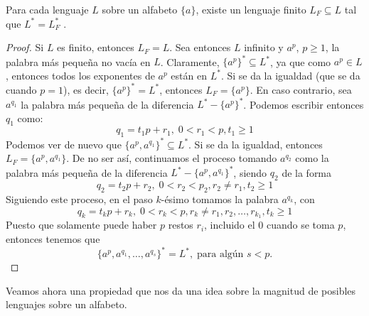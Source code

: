 \begin{teorema} Para cada lenguaje $L$ sobre un alfabeto $\{a\}$, existe un lenguaje finito $L_F\subseteq L$ tal que
$L^*=L_F^*$ \cite{Mateescu1997}.
\end{teorema}
\begin{proof}
Si $L$ es finito, entonces $L_F=L$. Sea entonces $L$ infinito y $a^p$, $p\geq 1$, la palabra más pequeña no vacía en 
$L$. Claramente, $\{a^p\}^*\subseteq L^*$, ya que como $a^p\in L$, entonces todos los exponentes de $a^p$ están en
$L^*$. Si se da la igualdad (que se da cuando $p=1$), es decir, $\{a^p\}^*=L^*$, entonces $L_F=\{a^p\}$. En caso
contrario, sea $a^{q_1}$ la palabra más pequeña de la diferencia $L^*-\{a^p\}^*$. Podemos escribir entonces $q_1$ como:
\begin{equation}
    q_1=t_1p+r_1,\;0<r_1<p,t_1\geq 1
\end{equation}
Podemos ver de nuevo que $\{a^p, a^{q_1}\}^*\subseteq L^*$. Si se da la igualdad, entonces $L_F=\{a^p, a^{q_1}\}$. De
no ser así, continuamos el proceso tomando $a^{q_2}$ como la palabra más pequeña de la diferencia 
$L^*-\{a^p, a^{q_1}\}^*$, siendo $q_2$ de la forma
\begin{equation}
    q_2=t_2p+r_2,\;0<r_2<p_2, r_2\neq r_1, t_2\geq 1
\end{equation}
Siguiendo este proceso, en el paso $k$-ésimo tomamos la palabra $a^{q_k}$, con
\begin{equation}
    q_k=t_kp+r_k,\;0<r_k<p, r_k\neq r_1, r_2, \dots, r_{k_1}, t_k\geq 1
\end{equation}
Puesto que solamente puede haber $p$ restos $r_i$, incluido el $0$ cuando se toma $p$, entonces tenemos que
\begin{equation}
    \{a^p, a^{q_1}, \dots, a^{q_s}\}^*=L^*,\;\text{para algún } s<p.
\end{equation}
\end{proof}

Veamos ahora una propiedad que nos da una idea sobre la magnitud de posibles lenguajes sobre un alfabeto.


